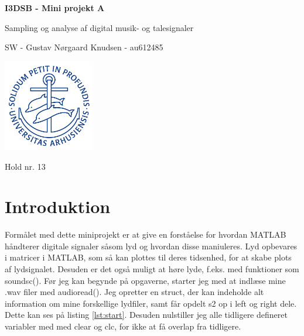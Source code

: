 \documentclass{article}
\begin{document}

\begin{titlepage}
    
  \begin{center}
    \vspace*{1cm}

    \Huge
    \textbf{I3DSB - Mini projekt A}

    \vspace{0.5cm}
    \huge
    Sampling og analyse af digital musik- og talesignaler \\
    \date\today

    \vspace{3cm}

    \Large
    SW - Gustav Nørgaard Knudsen - au612485 
    
    \vfill
    \includegraphics[width=0.3\textwidth]{au2}
    \vspace{2cm}

    Hold nr. 13

  \end{center}
\end{titlepage}

\newpage
\newpage

\setcounter{page}{1}


\section*{Introduktion}
Formålet med dette miniprojekt er at give en forståelse for hvordan MATLAB håndterer digitale signaler såsom lyd og hvordan disse maniuleres. Lyd opbevares i matricer i MATLAB, som så kan plottes til deres tidsenhed, for at skabe plots af lydsignalet. Desuden er det også muligt at høre lyde, f.eks. med funktioner som soundsc(). Før jeg kan begynde på opgaverne, starter jeg med at indlæse mine .wav filer med audioread(). Jeg opretter en struct, der kan indeholde alt information om mine forskellige lydfiler, samt får opdelt s2 op i left og right dele. Dette kan ses på listing \ref{lst:start}. Desuden nulstiller jeg alle tidligere defineret variabler med med clear og clc, for ikke at få overlap fra tidligere.
\end{document}
